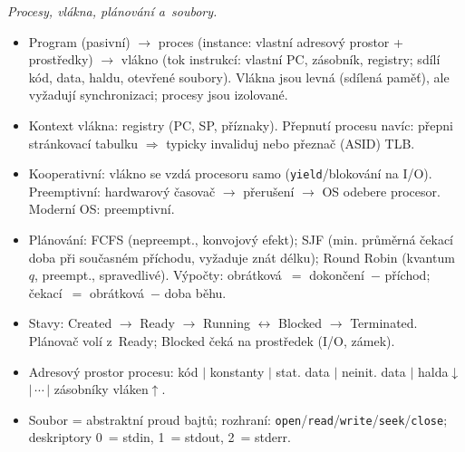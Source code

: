 \documentclass[11pt,a4paper]{article}
\begin{document}
\begin{poznamka}
\smallskip
\emph{Procesy, vlákna, plánování a~soubory.}
\begin{itemize}
  \item Program (pasivní) $\to$ proces (instance: vlastní adresový prostor + prostředky) $\to$ vlákno (tok instrukcí: vlastní PC, zásobník, registry; sdílí kód, data, haldu, otevřené soubory). Vlákna jsou levná (sdílená paměť), ale vyžadují synchronizaci; procesy jsou izolované.
  \item Kontext vlákna: registry (PC, SP, příznaky). Přepnutí procesu navíc: přepni stránkovací tabulku $\Rightarrow$ typicky invaliduj nebo přeznač (ASID) TLB.
  \item Kooperativní: vlákno se vzdá procesoru samo (\texttt{yield}/blokování na I/O). Preemptivní: hardwarový časovač $\to$ přerušení $\to$ OS odebere procesor. Moderní OS: preemptivní.
  \item Plánování: FCFS (nepreempt., konvojový efekt); SJF (min. průměrná čekací doba při současném příchodu, vyžaduje znát délku); Round Robin (kvantum $q$, preempt., spravedlivé). Výpočty: obrátková~$=$ dokončení~$-$ příchod; čekací~$=$ obrátková~$-$ doba běhu.
  \item Stavy: Created $\to$ Ready $\to$ Running $\leftrightarrow$ Blocked $\to$ Terminated. Plánovač volí z~Ready; Blocked čeká na prostředek (I/O, zámek).
  \item Adresový prostor procesu: kód $|$ konstanty $|$ stat. data $|$ neinit. data $|$ halda$\downarrow$ $|\,\cdots\,|$ zásobníky vláken$\uparrow$.
  \item Soubor = abstraktní proud bajtů; rozhraní: \texttt{open}/\texttt{read}/\texttt{write}/\texttt{seek}/\texttt{close}; deskriptory 0~= stdin, 1~= stdout, 2~= stderr.
\end{itemize}


\end{poznamka}
\end{document}

